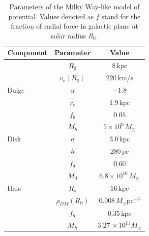 \documentclass[a4paper,fleqn,usenatbib]{mnras}
\begin{document}
\begin{table}
	\centering
	\caption{Parameters of the Milky Way-like model of potential. Values denoted as $ f $ stand for the fraction of radial force in galactic plane at solar radius $ R_0 $.}
	\label{tab:MWpot_params}
	\begin{tabular}{lcc} %
		\hline
		Component & Parameter		 		& Value \\
		\hline
		\hline
			 	&$ R_0 $			 		& $ 8				\,\mathrm{kpc} $\\
				&$ v_c(R_0) $		 		& $ 220				\,\mathrm{km/s} $\\
		\hline
		\hline
		Bulge 	&$ \alpha $				& $ -1.8			 $\\
				&$ r_c $ 					& $ 1.9				\,\mathrm{kpc} $\\
				&$ f_b $			 		& $ 0.05			 $\\
				&$ M_{b} $		 			& $ 5\times 10^{9} 	\,M_{\odot} $\\
		\hline
		Disk	&$ a $			 			& $ 3.0				\,\mathrm{kpc} $\\
				&$ b $			 			& $ 280				\,\mathrm{pc} $\\
				&$ f_d $			 		& $ 0.60			 $\\
				&$ M_{d} $		 			& $ 6.8\times 10^{10}\,M_{\odot} $\\
		\hline
		Halo	&$ R_s $	 				& $ 16				\,\mathrm{kpc} $\\
				&$ \rho_{DM}(R_0) $ 		& $ 0.008			\,M_{\odot}\mathrm{pc^{-3}} $\\
				&$ f_{h} $ 					& $ 0.35			\,\mathrm{kpc} $\\
				&$ M_{h} $		 			& $	3.27			\,\times 10^{11} M_{\odot}$\\
		\hline
	\end{tabular}
\end{table}
\end{document}

